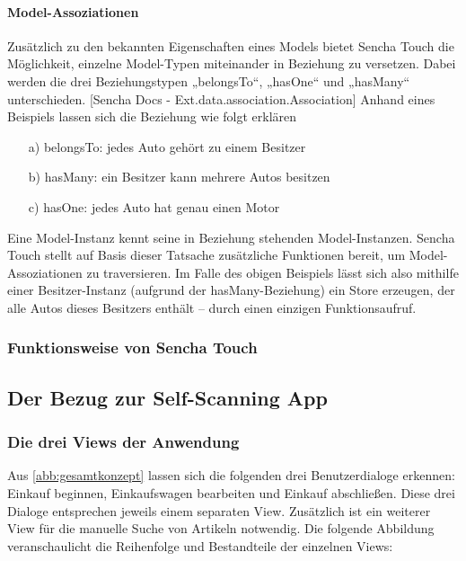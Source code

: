 \paragraph{Model-Assoziationen}
Zusätzlich zu den bekannten Eigenschaften eines Models bietet Sencha Touch die Möglichkeit, einzelne Model-Typen miteinander in Beziehung zu versetzen. Dabei werden die drei Beziehungstypen „belongsTo“, „hasOne“ und „hasMany“ unterschieden. [Sencha Docs - Ext.data.association.Association] Anhand eines Beispiels lassen sich die Beziehung wie folgt erklären
\begin{itemize}
	\item[a)] belongsTo: jedes Auto gehört zu einem Besitzer
	\item[b)] hasMany: ein Besitzer kann mehrere Autos besitzen
	\item[c)] hasOne: jedes Auto hat genau einen Motor
\end{itemize}
Eine Model-Instanz kennt seine in Beziehung stehenden Model-Instanzen. Sencha Touch stellt auf Basis dieser Tatsache zusätzliche Funktionen bereit, um Model-Assoziationen zu traversieren. Im Falle des obigen Beispiels lässt sich also mithilfe einer Besitzer-Instanz (aufgrund der hasMany-Beziehung) ein Store erzeugen, der alle Autos dieses Besitzers enthält – durch einen einzigen Funktionsaufruf.

\subsubsection*{Funktionsweise von Sencha Touch}

\subsection{Der Bezug zur Self-Scanning App}
\subsubsection*{Die drei Views der Anwendung}
Aus \vref{abb:gesamtkonzept} lassen sich die folgenden drei Benutzerdialoge erkennen: Einkauf beginnen, Einkaufswagen bearbeiten und Einkauf abschließen. Diese drei Dialoge entsprechen jeweils einem separaten View. Zusätzlich ist ein weiterer View für die manuelle Suche von Artikeln notwendig. Die folgende Abbildung veranschaulicht die Reihenfolge und Bestandteile der einzelnen Views:

